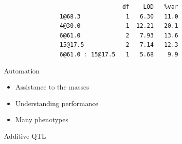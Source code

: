 \documentclass[12pt]{article}
\newcommand{\headsize}{\fontsize{35}{35} \selectfont}
\newcommand{\smallersize}{\fontsize{20}{25} \selectfont}
\begin{document}
\vspace{40mm}

\color{mywhite} \smallersize

\begin{verbatim}
                                  df    LOD   %var
                1@68.3             1   6.30   11.0
                4@30.0             1  12.21   20.1
                6@61.0             2   7.93   13.6
                15@17.5            2   7.14   12.3
                6@61.0 : 15@17.5   1   5.68    9.9
\end{verbatim}




\newpage

\headsize \color{myyellow}
\hfill \begin{minipage}{5.75in}
\centering
Automation
\end{minipage}

\vspace{3cm} \color{mywhite} \smallersize

\hfill \begin{minipage}{10in}
\begin{itemize}
\itemsep24pt

\item Assistance to the masses

\item Understanding performance

\item Many phenotypes

\end{itemize}
\end{minipage}


\newpage


\headsize \color{myyellow}
\hfill \begin{minipage}{5.75in}
\centering
Additive QTL
\end{minipage}

\vspace{2cm} \color{mywhite} \smallersize
\end{document}
